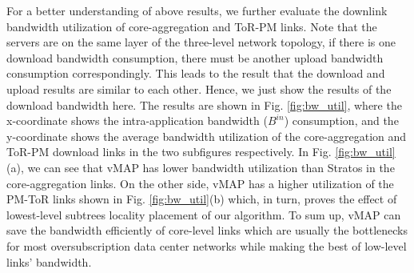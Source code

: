 \documentclass[review]{elsarticle}
\begin{document}
For a better understanding of above results, we further evaluate the downlink bandwidth utilization of core-aggregation and ToR-PM links. Note that the servers are on the same layer of the three-level network topology, if there is one download bandwidth consumption, there must be another upload bandwidth consumption correspondingly. This leads to the result that the download and upload results are similar to each other. Hence, we just show the results of the download bandwidth here. The results are shown in Fig. \ref{fig:bw_util}, where the x-coordinate shows the
 intra-application bandwidth ($B^{in}$) consumption, and the y-coordinate shows the average bandwidth utilization of the core-aggregation and ToR-PM download links in the two subfigures respectively. In Fig. \ref{fig:bw_util}(a), we can see that vMAP has lower bandwidth utilization than Stratos in the core-aggregation links. On the other side, vMAP has a higher utilization of the PM-ToR links shown in Fig. \ref{fig:bw_util}(b) which, in turn, proves the effect of lowest-level subtrees locality placement of our algorithm. To sum up, vMAP can save the bandwidth efficiently of core-level links which are usually the bottlenecks for most oversubscription data center networks while making the best of low-level links’ bandwidth. 
\end{document}
